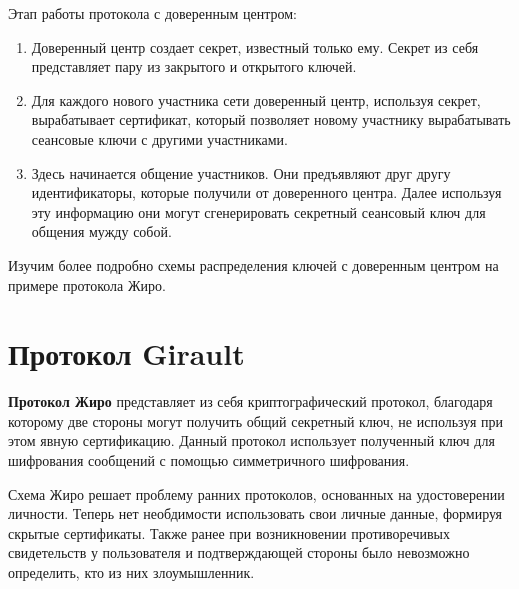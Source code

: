 \documentclass[a4paper]{article}
\begin{document}
Этап работы протокола с доверенным центром:
\begin{enumerate}
    \item Доверенный центр создает секрет, известный только ему. Секрет из себя представляет пару из закрытого и открытого ключей.
    \item Для каждого нового участника сети доверенный центр, используя секрет, вырабатывает сертификат, который позволяет новому участнику 
    вырабатывать сеансовые ключи с другими участниками.
    \item Здесь начинается общение участников. Они предъявляют друг другу идентификаторы, которые получили от доверенного центра. Далее используя эту информацию они могут сгенерировать секретный сеансовый ключ для общения мужду собой.
\end{enumerate}

Изучим более подробно схемы распределения ключей с доверенным центром на примере протокола Жиро. 
\section{Протокол Girault}

\textbf{Протокол Жиро} представляет из себя криптографический протокол, благодаря которому две стороны могут получить общий секретный ключ, не используя при этом явную сертификацию. 
Данный протокол использует полученный ключ для шифрования сообщений с помощью симметричного шифрования.

Схема Жиро решает проблему ранних протоколов, основанных на удостоверении личности. Теперь нет необдимости использовать свои личные данные, формируя скрытые сертификаты.
Также ранее при возникновении противоречивых свидетельств у пользователя и подтверждающей стороны было невозможно определить, кто из них  злоумышленник.
\end{document}
